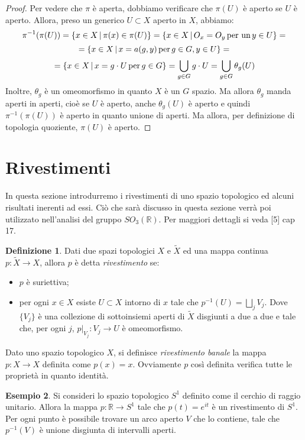 \documentclass[12pt,a4paper]{report}
\theoremstyle{definition}
\newtheorem{Def}{Definizione}[chapter]
\theoremstyle{Theorem}
\theoremstyle{definition}
\newtheorem{Ex}[Def]{Esempio}
\theoremstyle{definition}
\theoremstyle{definition}
\begin{document}
\begin{proof}
	Per vedere che $\pi$ è aperta, dobbiamo verificare che $\pi(U)$ è aperto se $U$ è aperto. Allora, preso un generico $U\subset X$ aperto in $X$, abbiamo:
	$$\pi^{-1}(\pi(U))=\{x\in X \,|\, \pi(x)\in \pi(U)\}=\{x\in X \,|\, O_x=O_y \,\hbox{per un} \, y\in U\}=$$
	$$=\{x\in X \, | \, x=a(g,y) \, \hbox{per} \, g\in G, y\in U\}=$$
	$$=\{x\in X \, | \, x=g\cdot U \, \hbox{per} \, g\in G\}= \bigcup_{g\in G} g\cdot U=\bigcup_{g\in G}\theta_g(U)$$
	Inoltre, $\theta_g$ è un omeomorfismo in quanto $X$ è un $G$ spazio. Ma allora $\theta_g$ manda aperti in aperti, cioè se $U$ è aperto, anche $\theta_g(U)$ è aperto e quindi $\pi^{-1}(\pi(U))$ è aperto in quanto unione di aperti. Ma allora, per definizione di topologia quoziente, $\pi(U)$ è aperto.
\end{proof}
\section{Rivestimenti}
In questa sezione introdurremo i rivestimenti di uno spazio topologico ed alcuni risultati inerenti ad essi. Ciò che sarà discusso in questa sezione verrà poi utilizzato nell'analisi del gruppo $SO_3(\mathbb{R})$. Per maggiori dettagli si veda [5] cap 17.
\begin{Def} \label{Def: 2.2.2}
	Dati due spazi topologici $X$ e $\tilde{X}$ ed una mappa continua $p:\tilde{X}\rightarrow X$, allora $p$ è detta \textit{rivestimento} se:
	\begin{itemize}
		\item $p$ è suriettiva;
		\item per ogni $x\in X$ esiste $U\subset X$ intorno di $x$ tale che $p^{-1}(U)=\bigsqcup_j V_j$. Dove $\{V_j\}$ è una collezione di sottoinsiemi aperti di $\tilde{X}$ disgiunti a due a due e tale che, per ogni $j$, $p\rvert_{V_j}:V_j\rightarrow U$ è omeomorfismo. 
	\end{itemize}
\end{Def}
	Dato uno spazio topologico $X$, si definisce \textit{rivestimento banale} la mappa $p:X\rightarrow X$ definita come $p(x)=x$. Ovviamente $p$ così definita verifica tutte le proprietà in quanto identità.
\begin{Ex}
	Si consideri lo spazio topologico $S^1$ definito come il cerchio di raggio unitario. Allora la mappa $p:\mathbb{R}\rightarrow S^1$ tale che $p(t)=e^{it}$ è un rivestimento di $S^1$. Per ogni punto è possibile trovare un arco aperto $V$ che lo contiene, tale che $p^{-1}(V)$ è unione disgiunta di intervalli aperti.
\end{Ex}
\end{document}

